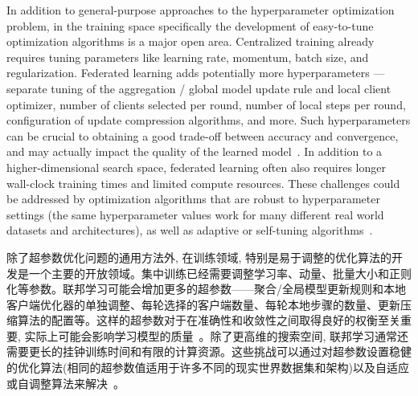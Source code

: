 In addition to general-purpose approaches to the hyperparameter optimization problem, in the training space specifically the development of easy-to-tune optimization algorithms is a major open area. Centralized training already requires tuning parameters like learning rate, momentum, batch size, and regularization. Federated learning adds potentially more hyperparameters --- separate tuning of the aggregation / global model update rule and local client optimizer, number of clients selected per round, number of local steps per round, configuration of update compression algorithms, and more. Such hyperparameters can be crucial to obtaining a good trade-off between accuracy and convergence, and may actually impact the quality of the learned model~\citep{charles2020outsized}. In addition to a higher-dimensional search space, federated learning often also requires longer wall-clock training times and limited compute resources. These challenges could be addressed by optimization algorithms that are robust to hyperparameter settings (the same hyperparameter values work for many different real world datasets and architectures), as well as adaptive or self-tuning algorithms~\cite{thakkar2019differentially,bonawitz2019autotune}.

除了超参数优化问题的通用方法外, 在训练领域, 特别是易于调整的优化算法的开发是一个主要的开放领域。集中训练已经需要调整学习率、动量、批量大小和正则化等参数。联邦学习可能会增加更多的超参数——聚合/全局模型更新规则和本地客户端优化器的单独调整、每轮选择的客户端数量、每轮本地步骤的数量、更新压缩算法的配置等。这样的超参数对于在准确性和收敛性之间取得良好的权衡至关重要, 实际上可能会影响学习模型的质量~\citep{charles2020outsized}。除了更高维的搜索空间, 联邦学习通常还需要更长的挂钟训练时间和有限的计算资源。这些挑战可以通过对超参数设置稳健的优化算法(相同的超参数值适用于许多不同的现实世界数据集和架构)以及自适应或自调整算法来解决~\cite{thakkar2019differentially,bonawitz2019autotune}。


